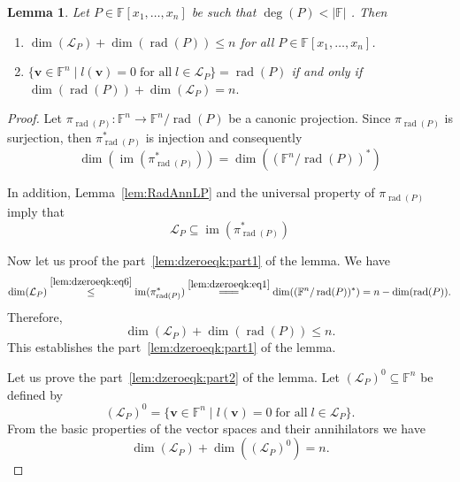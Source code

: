 \documentclass{elsarticle}
\DeclareMathOperator{\Img}{im}
\DeclareMathOperator{\rad}{rad}
\def\F{{\mathbb F}}
\newtheorem{lemma}[theorem]{Lemma}
\theoremstyle{definition}
\numberwithin{equation}{section}
\begin{document}
\begin{lemma}\label{lem:dzeroeqk}Let $P \in \F[x_1,\ldots, x_n]$ be such that $\deg(P) < |\F|$ . Then
\begin{enumerate}[label=(\alph*), ref=(\alph*)]
\item\label{lem:dzeroeqk:part1} $\dim (\mathcal L_P) + \dim (\rad(P)) \leqslant n$ for all $P \in \F[x_1,\ldots, x_n]$.
\item\label{lem:dzeroeqk:part2} $\{\mathbf v \in \F^n \mid l(\mathbf v) = 0\;\mbox{for all} \;l \in \mathcal L_P\} = \rad(P)$ if and only if $\dim (\rad(P)) + \dim (\mathcal L_P) = n.$
\end{enumerate}
\end{lemma}
\begin{proof}Let $\pi_{\rad(P)} \colon \F^n \to \F^n/\rad(P)$ be a canonic projection. Since $\pi_{\rad(P)}$ is surjection, then $\pi_{\rad(P)}^*$ is injection and consequently
\begin{equation}\label{lem:dzeroeqk:eq1}
\dim(\Img (\pi_{\rad(P)}^*)) = \dim((\F^n/\rad(P))^*)
\end{equation}

In addition, Lemma~\ref{lem:RadAnnLP} and the universal property of $\pi_{\rad(P)}$ imply that 
\begin{equation}\label{lem:dzeroeqk:eq6}
\mathcal L_P \subseteq \Img (\pi_{\rad(P)}^*)
\end{equation}

Now let us proof the part~\ref{lem:dzeroeqk:part1} of the lemma. We have
 \begin{equation}\label{lem:dzeroeqk:eq2}
\dim (\mathcal L_P) \overset{\eqref{lem:dzeroeqk:eq6}}{\leq} \Img (\pi_{\rad(P)}^*) \stackrel{\eqref{lem:dzeroeqk:eq1}}{=\joinrel=\joinrel=} \dim((\F^n/\rad(P))^*) = n - \dim(\rad(P)).
\end{equation}
Therefore,
\begin{equation*}
\dim (\mathcal L_P) +  \dim(\rad(P)) \le n.
\end{equation*}
This establishes the part~\ref{lem:dzeroeqk:part1} of the lemma.

Let us prove the part~\ref{lem:dzeroeqk:part2} of the lemma. Let $(\mathcal L_P)^0 \subseteq \F^n$ be defined by 
\begin{equation}\label{lem:dzeroeqk:eq11}
(\mathcal L_P)^0 = \{\mathbf v \in \F^n \mid l(\mathbf v) = 0\;\mbox{for all} \;l \in \mathcal L_P\}. 
\end{equation}
From the basic properties of the vector spaces and their annihilators we have
\begin{equation}\label{lem:dzeroeqk:eq4} %
\dim(\mathcal L_P) + \dim ((\mathcal L_P)^0) = n.
\end{equation}


\end{proof}
\end{document}
